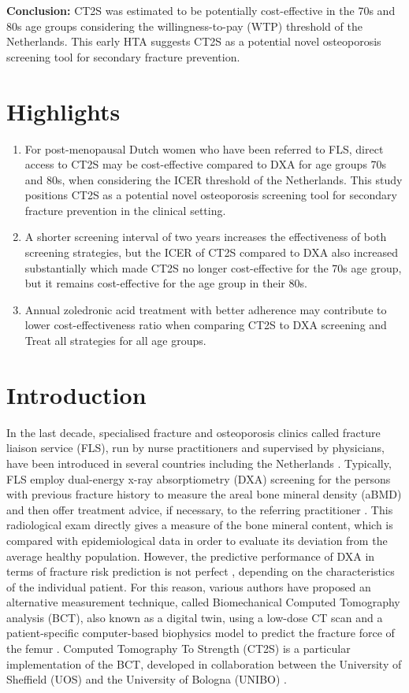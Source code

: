 {\bf Conclusion:} CT2S was estimated to be potentially cost-effective in the 70s and 80s age groups considering the willingness-to-pay (WTP) threshold of the Netherlands. This early HTA suggests CT2S as a potential novel osteoporosis screening tool for secondary fracture prevention. 

\section{Highlights}
\begin{enumerate}
\item For post-menopausal Dutch women who have been referred to FLS, direct access to CT2S may be cost-effective compared to DXA for age groups 70s and 80s, when considering the ICER threshold of the Netherlands. This study positions CT2S as a potential novel osteoporosis screening tool for secondary fracture prevention in the clinical setting.
\item A shorter screening interval of two years increases the effectiveness of both screening strategies, but the ICER of CT2S compared to DXA also increased substantially which made CT2S no longer cost-effective for the 70s age group, but it remains cost-effective for the age group in their 80s.
\item Annual zoledronic acid treatment with better adherence may contribute to lower cost-effectiveness ratio when comparing CT2S to DXA screening and Treat all strategies for all age groups.
\end{enumerate}

\section{Introduction}

In the last decade, specialised fracture and osteoporosis clinics called fracture liaison service (FLS), run by nurse practitioners and supervised by physicians, have been introduced in several countries including the Netherlands \cite{4-1}. Typically, FLS employ dual-energy x-ray absorptiometry (DXA) screening for the persons with previous fracture history to measure the areal bone mineral density (aBMD) and then offer treatment advice, if necessary, to the referring practitioner \cite{4-1}. This radiological exam directly gives a measure of the bone mineral content, which is compared with epidemiological data in order to evaluate its deviation from the average healthy population. However, the predictive performance of DXA in terms of fracture risk prediction is not perfect \cite{4-2,4-3,4-4}, depending on the characteristics of the individual patient. For this reason, various authors have proposed an alternative measurement technique, called Biomechanical Computed Tomography analysis (BCT), also known as a digital twin, using a low-dose CT scan and a patient-specific computer-based biophysics model to predict the fracture force of the femur \cite{4-4,4-5,4-6}. Computed Tomography To Strength (CT2S) is a particular implementation of the BCT, developed in collaboration between the University of Sheffield (UOS) and the University of Bologna (UNIBO) \cite{4-3,4-6,4-7}. 

